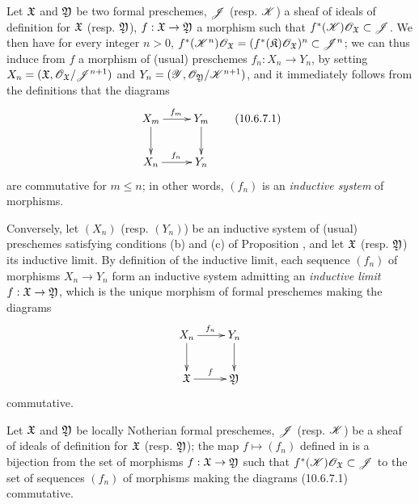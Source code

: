 \begin{env}[10.6.7]
\label{1.10.6.7}
Let $\mathfrak{X}$ and $\mathfrak{Y}$ be two formal preschemes, $\mathscr{J}$ (resp. $\mathscr{K}$) a sheaf of ideals of definition for $\mathfrak{X}$ (resp. $\mathfrak{Y}$), $f:\fk{X}\to\fk{Y}$ a morphism such that $f^*(\mathscr{K})\mathscr{O}_\mathfrak{X}\subset\mathscr{J}$.
We then have for every integer $n>0$, $f^*(\mathscr{K}^n)\mathscr{O}_\mathfrak{X}=(f^*(\mathfrak{K})\mathscr{O}_\mathfrak{X})^n\subset\mathscr{J}^n$; we can thus  induce from $f$ a morphism of (usual) preschemes $f_n:X_n\to Y_n$, by setting $X_n=(\mathfrak{X},\mathscr{O}_\mathfrak{X}/\mathscr{J}^{n+1})$ and $Y_n=(\mathscr{Y},\mathscr{O}_\mathfrak{Y}/\mathscr{K}^{n+1})$, and it immediately follows from the definitions that the diagrams
\[
  \xymatrix{
    X_m\ar[r]^{f_m}\ar[d] &
    Y_m\ar[d]\\
    X_n\ar[r]^{f_n} &
    Y_n
  }
  \tag{10.6.7.1}
\]
are commutative for $m\leqslant n$; in other words, $(f_n)$ is an \emph{inductive system} of morphisms.
\end{env}

\begin{env}[10.6.8]
\label{1.10.6.8}
Conversely, let $(X_n)$ (resp. $(Y_n)$) be an inductive system of (usual) preschemes satisfying conditions (b) and (c) of Proposition , and let $\mathfrak{X}$ (resp. $\mathfrak{Y}$) its inductive limit.
By definition of the inductive limit, each sequence $(f_n)$ of morphisms $X_n\to Y_n$ form an inductive system admitting an \emph{inductive limit $f:\fk{X}\to\fk{Y}$}, which is the unique morphism of formal preschemes making the diagrams
\[
  \xymatrix{
    X_n\ar[r]^{f_n}\ar[d] &
    Y_n\ar[d]\\
    \fk{X}\ar[r]^f &
    \fk{Y}
  }
\]
commutative.
\end{env}

\begin{prop}[10.6.9]
\label{1.10.6.9}
Let $\mathfrak{X}$ and $\mathfrak{Y}$ be locally Notherian formal preschemes, $\mathscr{J}$ (resp. $\mathscr{K}$) be a sheaf of ideals of definition for $\mathfrak{X}$ (resp. $\mathfrak{Y}$); the map $f\mapsto(f_n)$ defined in  is a bijection from the set of morphisms $f:\fk{X}\to\fk{Y}$ such that $f^*(\mathscr{K})\mathscr{O}_\mathfrak{X}\subset\mathscr{J}$ to the set of sequences $(f_n)$ of morphisms making the diagrams (10.6.7.1) commutative.
\end{prop}

